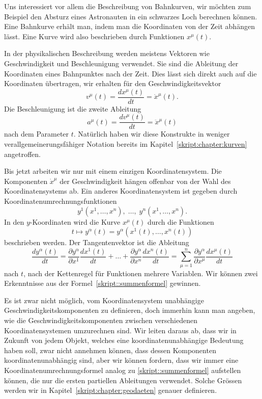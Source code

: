 Uns interessiert vor allem die Beschreibung von Bahnkurven, wir möchten
zum Beispiel den Absturz eines Astronauten in ein schwarzes Loch berechnen
können.
Eine Bahnkurve erhält man, indem man die Koordinaten von der Zeit
abhängen lässt.
Eine Kurve wird also beschrieben durch Funktionen $x^\mu(t)$.

In der physikalischen Beschreibung werden meistens Vektoren wie
Geschwindigkeit und Beschleunigung verwendet.
Sie sind die Ableitung der Koordinaten eines Bahnpunktes nach
der Zeit.
Dies lässt sich direkt auch auf die Koordinaten übertragen,
wir erhalten für den Geschwindigkeitsvektor
\[
v^{\mu}(t) = \frac{dx^\mu(t)}{dt} = \dot x^\mu(t).
\]
Die Beschleunigung ist die zweite Ableitung
\[
a^\mu(t)
=
\frac{dv^\mu(t)}{dt}
=
\ddot x^\mu(t)
\]
nach dem Parameter $t$.
Natürlich haben wir diese Konstrukte in weniger verallgemeinerungsfähiger
Notation bereits im Kapitel~\ref{skript:chapter:kurven} angetroffen.

Bis jetzt arbeiten wir nur mit einem einzigen Koordinatensystem.
Die Komponenten $\dot x^\mu$ der Geschwindigkeit hängen offenbar
von der Wahl des Koordinatensystems ab.
Ein anderes Koordinatensystem ist gegeben durch
Koordinatenumrechnungsfunktionen
\[
y^1(x^1,\dots,x^n),\;\dots,\;y^n(x^1,\dots,x^n).
\]
In den $y$-Koordinaten wird die Kurve $x^\mu(t)$ durch die Funktionen
\[
t\mapsto y^\alpha(t)=y^\alpha(x^1(t),\dots,x^n(t))
\]
beschrieben werden.
Der Tangentenvektor ist die Ableitung 
\begin{equation}
\frac{dy^\alpha(t)}{dt}
=
\frac{\partial y^\alpha}{\partial x^1}\frac{dx^1(t)}{dt}
+\dots+
\frac{\partial y^\alpha}{\partial x^n}\frac{dx^n(t)}{dt}
=
\sum_{\mu=1}^n
\frac{\partial y^\alpha}{\partial x^\mu}\frac{dx^\mu(t)}{dt}
\label{skript::summenformel}
\end{equation}
nach $t$, nach der Kettenregel für Funktionen mehrere Variablen.
Wir können zwei Erkenntnisse aus der Formel~\eqref{skript::summenformel}
gewinnen.

Es ist zwar nicht möglich, vom Koordinatensystem unabhängige
Geschwindigkeitskomponenten zu definieren, doch immerhin kann man
angeben, wie die Geschwindigkeitskomponenten zwischen verschiedenen
Koordinatensystemen umzurechnen sind.
Wir leiten daraus ab, dass wir in Zukunft von jedem Objekt, welches
eine koordinatenunabhängige Bedeutung haben soll, zwar nicht
annehmen können, dass dessen Komponenten koordinatenunabhängig sind,
aber wir können fordern, dass wir immer eine Koordinatenumrechnungsformel
analog zu \eqref{skript::summenformel} aufstellen können, die nur die
ersten partiellen Ableitungen verwendet.
Solche Grössen werden wir in Kapitel~\ref{skript:chapter:geodaeten}
genauer definieren.

